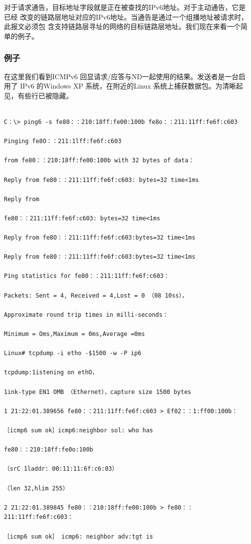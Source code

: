 对于请求通告，目标地址字段就是正在被查找的IPv6地址。对于主动通告，它是已经
改变的链路层地址对应的IPv6地址。当通告是通过一个组播地址被请求时，此报文必须包
含支持链路层寻址的网络的目标链路层地址。我们现在来看一个简单的例子。

\subsubsection{例子}

在这里我们看到ICMPv6 回显请求/应答与ND一起使用的结果。发送者是一台启用了
IPv6 的Windows XP 系统，在附近的Linux 系统上捕获数据包。为清晰起见，有些行已被隐藏。
\begin{verbatim}
    
C：\> ping6 -s fe80：：210:18ff:fe00:100b fe8o：：211:11ff:fe6f:c603

Pinging fe8O：：211:1lff:fe6f:c603

from fe80：：210:18ff:fe00:100b with 32 bytes of data：

Reply from fe80：：211:11ff:fe6f:c603: bytes=32 time<1ms

Reply from

fe80：：211:11ff:fe6f:c603: bytes=32 time<1ms

Reply from fe8O：：211:11ff:fe6f:c603:bytes=32 time<1ms

Reply from fe80：：211:11ff:fe6f:c603:bytes=32 time<1ms

Ping statistics for fe80：：211:11ff:fe6f:c603：

Packets: Sent = 4, Received = 4,Lost = 0 （08 10ss），

Approximate round trip times in milli-seconds：

Minimum = Oms,Maximum = 0ms,Average =0ms

Linux# tcpdump -i etho -$1500 -w -P ip6

tcpdump:1istening on ethO，

1ink-type EN1 OMB （Ethernet），capture size 1500 bytes

1 21:22:01.389656 fe80：：211:11ff:fe6f:c603 > Ef02：：1:ff00:100b：

［icmp6 sum ok］icmp6:neighbor sol: who has

fe80：：210:18ff:fe0o:100b

（srC 1laddr: 00:11:11:6f:c6:03）

（len 32,hlim 255）

2 21:22:01.389845 fe80：：210:18ff:fe00:100b > fe80：：211:11ff:fe6f:c603：

［icmp6 sum ok］ icmp6: neighbor adv:tgt is


\end{verbatim}
